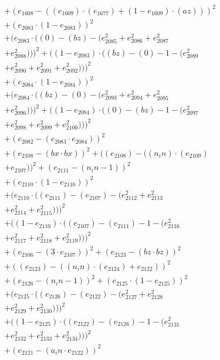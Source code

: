 \documentclass[10pt, a4paper]{article}
\begin{document}
\begin{align*}
& + (e_{1608} - ((e_{1609})  \cdot  (e_{1677}) + (1 - e_{1609})  \cdot  (az)))^{2} \\
& + (e_{2083}  \cdot  (1 - e_{2083}))^{2} \\
& + (e_{2083}  \cdot  ((0) - (bz) - (e_{2085}^{2} + e_{2086}^{2} + e_{2087}^{2} \\
& + e_{2088}^{2})))^{2} + ((1 - e_{2083})  \cdot  ((bz) - (0) - 1 - (e_{2089}^{2} \\
& + e_{2090}^{2} + e_{2091}^{2} + e_{2092}^{2})))^{2} \\
& + (e_{2084}  \cdot  (1 - e_{2084}))^{2} \\
& + (e_{2084}  \cdot  ((bz) - (0) - (e_{2093}^{2} + e_{2094}^{2} + e_{2095}^{2} \\
& + e_{2096}^{2})))^{2} + ((1 - e_{2084})  \cdot  ((0) - (bz) - 1 - (e_{2097}^{2} \\
& + e_{2098}^{2} + e_{2099}^{2} + e_{2100}^{2})))^{2} \\
& + (e_{2082} - (e_{2083}  \cdot  e_{2084}))^{2} \\
& + (e_{2108} - (bx  \cdot  bx))^{2} + ((e_{2108}) - ((n_in)  \cdot  (e_{2109}) \\
& + e_{2107}))^{2} + (e_{2111} - (n_in - 1))^{2} \\
& + (e_{2110}  \cdot  (1 - e_{2110}))^{2} \\
& + (e_{2110}  \cdot  ((e_{2111}) - (e_{2107}) - (e_{2112}^{2} + e_{2113}^{2} \\
& + e_{2114}^{2} + e_{2115}^{2})))^{2} \\
& + ((1 - e_{2110})  \cdot  ((e_{2107}) - (e_{2111}) - 1 - (e_{2116}^{2} \\
& + e_{2117}^{2} + e_{2118}^{2} + e_{2119}^{2})))^{2} \\
& + (e_{2106} - (3  \cdot  e_{2107}))^{2} + (e_{2123} - (bz  \cdot  bz))^{2} \\
& + ((e_{2123}) - ((n_in)  \cdot  (e_{2124}) + e_{2122}))^{2} \\
& + (e_{2126} - (n_in - 1))^{2} + (e_{2125}  \cdot  (1 - e_{2125}))^{2} \\
& + (e_{2125}  \cdot  ((e_{2126}) - (e_{2122}) - (e_{2127}^{2} + e_{2128}^{2} \\
& + e_{2129}^{2} + e_{2130}^{2})))^{2} \\
& + ((1 - e_{2125})  \cdot  ((e_{2122}) - (e_{2126}) - 1 - (e_{2131}^{2} \\
& + e_{2132}^{2} + e_{2133}^{2} + e_{2134}^{2})))^{2} \\
& + (e_{2121} - (a_in  \cdot  e_{2122}))^{2} \\

\end{align*}
\end{document}
